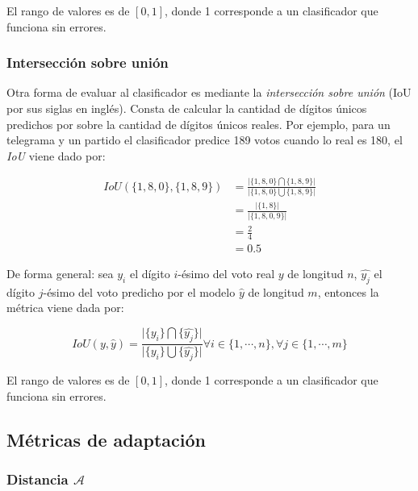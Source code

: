 \noindent
El rango de valores es de $[0, 1]$, donde 1 corresponde a un clasificador que funciona sin errores.

\subsubsection{Intersección sobre unión}

Otra forma de evaluar al clasificador es mediante la {\it intersección sobre unión} (IoU por sus siglas en inglés).
Consta de calcular la cantidad de dígitos únicos predichos por sobre la cantidad de dígitos únicos reales. Por ejemplo,
para un telegrama y un partido el clasificador predice 189 votos cuando lo real es 180, el {\it IoU} viene dado por:

\begin{align}
    IoU(\{1, 8, 0\}, \{1, 8, 9\}) & = \frac{\lvert\{1, 8, 0\} \bigcap \{1, 8, 9\}\rvert}{\lvert\{1, 8, 0\} \bigcup \{1, 8, 9\}\rvert} \nonumber \\
                                  & = \frac{\lvert\{1, 8\}\rvert}{\lvert\{1, 8, 0, 9\}\rvert}                                         \nonumber \\
                                  & = \frac{2}{4}                                                                     \nonumber                 \\
                                  & = 0.5
\end{align}

\noindent
De forma general: sea $y_{i}$ el dígito $i$-ésimo del voto real $y$ de longitud $n$, $\hat{y_{j}}$ el dígito $j$-ésimo
del voto predicho por el modelo $\hat{y}$ de longitud $m$, entonces la métrica viene dada por:

\begin{equation}
    IoU(y, \hat{y}) = \frac{\lvert \{y_{i}\} \bigcap \{\hat{y_{j}}\}\rvert}{\lvert \{y_{i}\} \bigcup \{\hat{y_{j}}\}\rvert} \forall i \in \{1, \cdots, n\}, \forall j \in \{1, \cdots, m\}
\end{equation}

\noindent
El rango de valores es de $[0, 1]$, donde 1 corresponde a un clasificador que funciona sin errores.

\subsection{Métricas de adaptación}
\subsubsection{Distancia $\mathcal{A}$}

